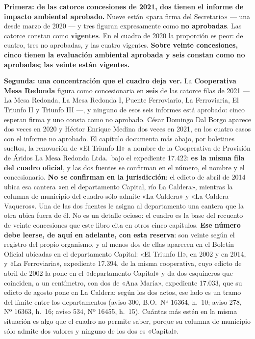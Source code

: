 \textbf{Primera: de las catorce concesiones de 2021, dos tienen el informe de impacto ambiental
aprobado.} Nueve están «para firma del Secretario» --- una desde marzo de 2020 --- y tres
figuran expresamente como \textbf{no aprobadas}. Las catorce constan como \textbf{vigentes}. En
el cuadro de 2020 la proporción es peor: de cuatro, tres no aprobadas, y las cuatro vigentes.
\textbf{Sobre veinte concesiones, cinco tienen la evaluación ambiental aprobada y seis constan
como no aprobadas; las veinte están vigentes.}

\textbf{Segunda: una concentración que el cuadro deja ver.} La \textbf{Cooperativa Mesa Redonda}
figura como concesionaria en \textbf{seis} de las catorce filas de 2021 --- La Mesa Redonda, La
Mesa Redonda I, Puente Ferroviario, La Ferroviaria, El Triunfo II y Triunfo III ---, y ninguno
de esos seis informes está aprobado: cinco esperan firma y uno consta como no aprobado. César
Domingo Dal Borgo aparece dos veces en 2020 y Héctor Enrique Medina dos veces en 2021, en los
cuatro casos con el informe no aprobado. El capítulo documenta más abajo, por boletines
sueltos, la renovación de «El Triunfo II» a nombre de la Cooperativa de Provisión de Áridos La
Mesa Redonda Ltda.\ bajo el expediente 17.422: \textbf{es la misma fila del cuadro oficial}, y
las dos fuentes se confirman en el número, el nombre y el concesionario. \textbf{No se confirman
en la jurisdicción}: el edicto de abril de 2014 ubica esa cantera «en el departamento Capital,
río La Caldera», mientras la columna de municipio del cuadro sólo admite «La Caldera» y «La
Caldera-Vaqueros». Una de las dos fuentes le asigna al departamento una cantera que la otra
ubica fuera de él. No es un detalle ocioso: el cuadro es la base del recuento de veinte
concesiones que este libro cita en otros cinco capítulos. \textbf{Ese número debe leerse, de aquí en adelante, con esta reserva}: son veinte según el registro del propio organismo, y al menos dos de ellas aparecen en el Boletín Oficial ubicadas en el departamento Capital: «El Triunfo II», en 2002 y en 2014, y «La Ferroviaria», expediente 17.394, de la misma cooperativa, cuyo edicto de abril de 2002 la pone en el «departamento Capital» y da dos esquineros que coinciden, a un centímetro, con dos de «Ana María», expediente 17.033, que su edicto de agosto pone en La Caldera: según los dos actos, ese lado es un tramo del límite entre los departamentos (aviso 300, B.O.\ Nº 16364, h.\ 10; aviso 278, Nº 16363, h.\ 16; aviso 534, Nº 16455, h.\ 15). Cuántas más estén en la misma situación es algo que el cuadro no permite saber, porque su columna de municipio sólo admite dos valores y ninguno de los dos es «Capital».

